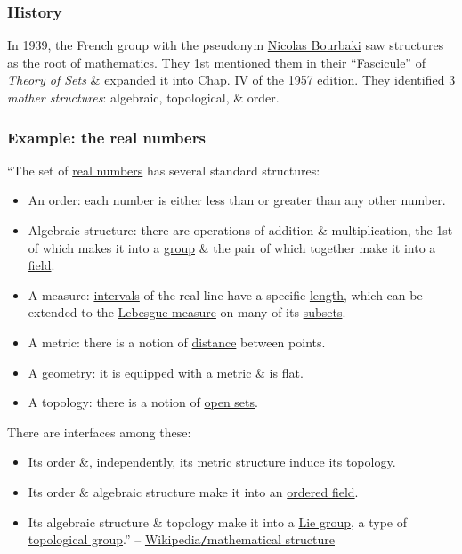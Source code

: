 \documentclass{article}
\begin{document}
\subsubsection{History}
In 1939, the French group with the pseudonym \href{https://en.wikipedia.org/wiki/Nicolas_Bourbaki}{\sc Nicolas Bourbaki} saw structures as the root of mathematics. They 1st mentioned them in their ``Fascicule'' of {\it Theory of Sets} \& expanded it into Chap. IV of the 1957 edition. They identified 3 {\it mother structures}: algebraic, topological, \& order.

\subsubsection{Example: the real numbers}
``The set of \href{https://en.wikipedia.org/wiki/Real_number}{real numbers} has several standard structures:
\begin{itemize}
	\item An order: each number is either less than or greater than any other number.
	\item Algebraic structure: there are operations of addition \& multiplication, the 1st of which makes it into a \href{https://en.wikipedia.org/wiki/Group_theory}{group} \& the pair of which together make it into a \href{https://en.wikipedia.org/wiki/Field_(mathematics)}{field}.
	\item A measure: \href{https://en.wikipedia.org/wiki/Interval_(mathematics)}{intervals} of the real line have a specific \href{https://en.wikipedia.org/wiki/Length}{length}, which can be extended to the \href{https://en.wikipedia.org/wiki/Lebesgue_measure}{Lebesgue measure} on many of its \href{https://en.wikipedia.org/wiki/Subset}{subsets}.
	\item A metric: there is a notion of \href{https://en.wikipedia.org/wiki/Metric_(mathematics)}{distance} between points.
	\item A geometry: it is equipped with a \href{https://en.wikipedia.org/wiki/Metric_(mathematics)}{metric} \& is \href{https://en.wikipedia.org/wiki/Flat_space}{flat}.
	\item A topology: there is a notion of \href{https://en.wikipedia.org/wiki/Open_set}{open sets}.
\end{itemize}
There are interfaces among these:
\begin{itemize}
	\item Its order \&, independently, its metric structure induce its topology.
	\item Its order \& algebraic structure make it into an \href{https://en.wikipedia.org/wiki/Ordered_field}{ordered field}.
	\item Its algebraic structure \& topology make it into a \href{https://en.wikipedia.org/wiki/Lie_group}{Lie group}, a type of \href{https://en.wikipedia.org/wiki/Topological_group}{topological group}.'' -- \href{https://en.wikipedia.org/wiki/Mathematical_structure}{Wikipedia{\tt/}mathematical structure}
\end{itemize}
\end{document}
